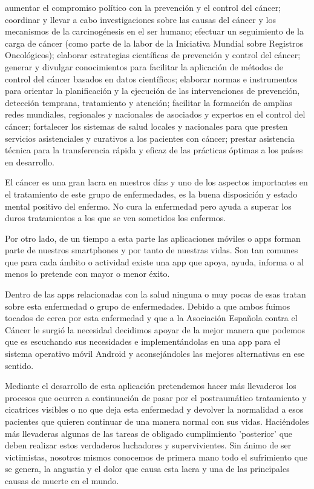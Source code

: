 \documentclass[../pfc.tex]{subfiles}
\begin{document}
aumentar el compromiso político con la prevención y el control del cáncer;
coordinar y llevar a cabo investigaciones sobre las causas del cáncer y los mecanismos de la carcinogénesis en el ser humano;
efectuar un seguimiento de la carga de cáncer (como parte de la labor de la Iniciativa Mundial sobre Registros Oncológicos);
elaborar estrategias científicas de prevención y control del cáncer;
generar y divulgar conocimientos para facilitar la aplicación de métodos de control del cáncer basados en datos científicos;
elaborar normas e instrumentos para orientar la planificación y la ejecución de las intervenciones de prevención, detección temprana, tratamiento y atención;
facilitar la formación de amplias redes mundiales, regionales y nacionales de asociados y expertos en el control del cáncer;
fortalecer los sistemas de salud locales y nacionales para que presten servicios asistenciales y curativos a los pacientes con cáncer;
prestar asistencia técnica para la transferencia rápida y eficaz de las prácticas óptimas a los países en desarrollo.

El cáncer es una gran lacra en nuestros días \cite{OMS} y uno de los aspectos importantes en el tratamiento de este grupo de enfermedades, es la buena disposición y estado mental positivo del enfermo. No cura la enfermedad pero ayuda a superar los duros tratamientos a los que se ven sometidos los enfermos.

Por otro lado, de un tiempo a esta parte las aplicaciones móviles o apps forman parte de nuestros smartphones y por tanto de nuestras vidas. Son tan comunes que para cada ámbito o actividad existe una app que apoya, ayuda, informa o al menos lo pretende con mayor o menor éxito.

Dentro de las apps relacionadas con la salud ninguna o muy pocas de esas tratan sobre esta enfermedad o grupo de enfermedades. Debido a que ambos fuimos tocados de cerca por esta enfermedad y que a la Asociación Española contra el Cáncer le surgió la necesidad decidimos apoyar de la mejor manera que podemos que es escuchando sus necesidades e implementándolas en una app para el sistema operativo móvil Android y aconsejándoles las mejores alternativas en ese sentido. 

Mediante el desarrollo de esta aplicación pretendemos hacer más llevaderos los procesos que ocurren a continuación de pasar por el postraumático tratamiento y cicatrices visibles o no que deja esta enfermedad y devolver la normalidad a esos pacientes que quieren continuar de una manera normal con sus vidas. Haciéndoles más llevaderas algunas de las tareas de obligado cumplimiento 'posterior' que deben realizar estos verdaderos luchadores y supervivientes.
Sin ánimo de ser victimistas, nosotros mismos conocemos de primera mano todo el sufrimiento que se genera, la angustia y el dolor que causa esta lacra y una de las principales causas de muerte en el mundo.
\end{document}
